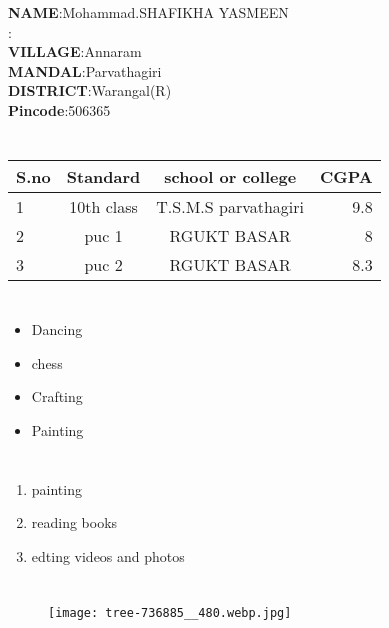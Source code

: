 \documentclass[a4paper,10pt]{article}
\title{\textbf{\color{red}{RESUME}}}
\begin{document}
\maketitle
\section{{\color{blue}{INTRODUCTION TO MYSELF}}}
\textbf{NAME}:Mohammad.SHAFIKHA YASMEEN\\
\textbf{{\color{black}{ADDRESS}}}:\\
\textbf{VILLAGE}:Annaram\\
\textbf{MANDAL}:Parvathagiri\\
\textbf{DISTRICT}:Warangal(R)\\
\textbf{Pincode}:506365\\
\section{{\color{blue}{EDUCATION DETAILS}}}
\begin{tabular}{|l|c|c|r|}
\hline
\centering
\textbf{S.no}&\textbf{Standard}&\textbf{school or college}&\textbf{CGPA}\\
\hline
1 & 10th class & T.S.M.S parvathagiri & 9.8\\
\hline
2 & puc 1 & RGUKT BASAR & 8\\
\hline
3 & puc 2 & RGUKT BASAR & 8.3\\
\hline
\end{tabular}
\section{{\color{blue}{EXTRA CURRICULAR ACTIVITIES}}}
\begin{itemize}
\item Dancing
\item chess  
\item Crafting
\item Painting
\end{itemize}
\section{{\color{blue}{HOBBIES}}}
\begin{enumerate}
\item painting
\item reading books
\item edting videos and photos
\end{enumerate}
\section{{\color{blue}{IMAGE}}}
\begin{figure}[h]
\texttt{[image: tree-736885\_\_480.webp.jpg]}
\end{figure}
\end{document}
